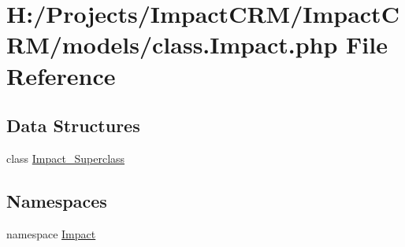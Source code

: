 \hypertarget{class_8Impact_8php}{
\section{H:/Projects/ImpactCRM/ImpactCRM/models/class.Impact.php File Reference}
\label{class_8Impact_8php}
}
\subsection*{Data Structures}
\begin{DoxyCompactItemize}
\item 
class \hyperlink{classImpact__Superclass}{Impact\_\-Superclass}
\end{DoxyCompactItemize}
\subsection*{Namespaces}
\begin{DoxyCompactItemize}
\item 
namespace \hyperlink{namespaceImpact}{Impact}
\end{DoxyCompactItemize}
